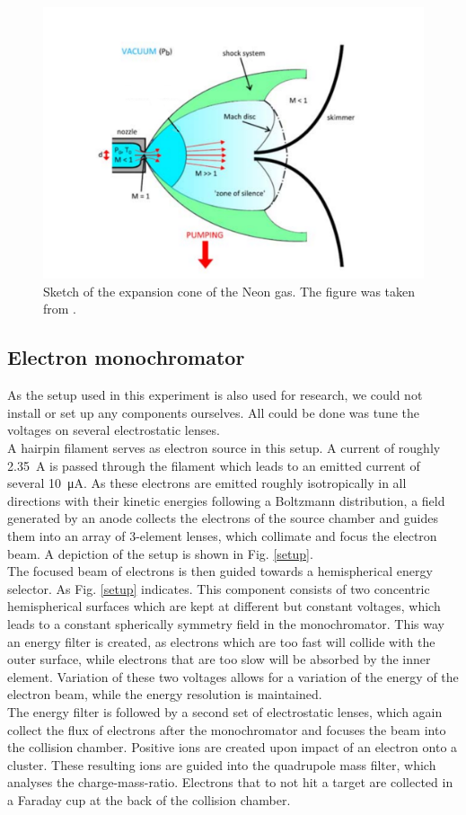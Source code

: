 \documentclass[a4paper,10pt]{article}
\begin{document}
\begin{figure}[htp!]
	\centering
	\includegraphics[width = 0.6 \textwidth]{expansion.png}
	\caption{Sketch of the expansion cone of the Neon gas. The figure was taken from \cite{script}. }
	\label{fig_expansion}
\end{figure}

\subsection{Electron monochromator}

As the setup used in this experiment is also used for research, we could not install or set up any components ourselves. All could be done was tune the voltages on several electrostatic lenses. 
\\
A hairpin filament serves as electron source in this setup. A current of roughly \SI{2.35}{\ampere} is passed through the filament which leads to an emitted current of several \SI{10}{\micro \ampere}. As these electrons are emitted roughly isotropically in all directions with their kinetic energies following a Boltzmann distribution, a field generated by an anode collects the electrons of the source chamber and guides them into an array of 3-element lenses, which collimate and focus the electron beam. A depiction of the setup is shown in Fig. \ref{setup}. 
\\
The focused beam of electrons is then guided towards a hemispherical energy selector. As Fig. \ref{setup} indicates. This component consists of two concentric hemispherical surfaces which are kept at different but constant voltages, which leads to a constant spherically symmetry field in the monochromator. This way an energy filter is created, as electrons which are too fast will collide with the outer surface, while electrons that are too slow will be absorbed by the inner element. Variation of these two voltages allows for a variation of the energy of the electron beam, while the energy resolution is maintained. 
\\
The energy filter is followed by a second set of electrostatic lenses, which again collect the flux of electrons after the monochromator and focuses the beam into the collision chamber. Positive ions are created upon impact of an electron onto a cluster. These resulting ions are guided into the quadrupole mass filter, which analyses the charge-mass-ratio. Electrons that to not hit a target are collected in a Faraday cup at the back of the collision chamber. 
\end{document}

